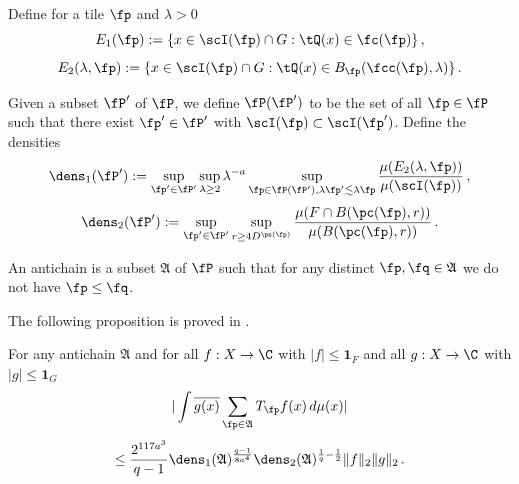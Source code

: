 Define for a tile $\fp$ and $\lambda>0$
\begin{equation}\label{definee1}
    E_1(\fp):=\{x\in \scI(\fp)\cap G: \tQ(x)\in \fc(\fp)\}\, ,
\end{equation}
\begin{equation}\label{definee2}
    E_2(\lambda, \fp):=\{x\in \scI(\fp)\cap G: \tQ(x)\in B_{\fp}(\fcc(\fp), \lambda)\}\, .
\end{equation}



Given a subset $\fP'$ of $\fP$, we define
$\fP(\fP')$ to be the set of
all $\fp \in \fP$ such that there exist $\fp' \in \fP'$ with $\scI(\fp)\subset \scI(\fp')$. Define the densities
\begin{equation}\label{definedens1}
    {\dens}_1(\fP') := \sup_{\fp'\in \fP'}\sup_{\lambda \geq 2} \lambda^{-a} \sup_{\fp \in \fP(\fP'), \lambda \fp' \lesssim \lambda \fp}
    \frac{\mu({E}_2(\lambda, \fp))}{\mu(\scI(\fp))}\, ,
\end{equation}
\begin{equation}\label{definedens2}
    {\dens}_2(\fP') := \sup_{\fp'\in \fP'}
    \sup_{r\ge 4D^{\ps(\fp)}}
    \frac{\mu(F\cap B(\pc(\fp),r))}{\mu(B(\pc(\fp),r))}\, .
\end{equation}





An antichain is a subset $\mathfrak{A}$
of $\fP$ such that for any distinct $\fp,\fq\in \mathfrak{A}$ we do not have $\fp\le \fq$.

The following proposition is proved in .

\begin{proposition}
\label{antichain-operator}
\leanok
{}

For any antichain $\mathfrak{A} $ and for all $f:X\to \C$ with $|f|\le \mathbf{1}_F$ and all $g:X\to\C$ with $|g| \le \mathbf{1}_G$
\begin{equation} \label{eq-antiprop}
    |\int \overline{g(x)} \sum_{\fp \in \mathfrak{A}} T_{\fp} f(x)\, d\mu(x)|
\end{equation}
\begin{equation}
    \le \frac{2^{117a^3}}{q-1} \dens_1(\mathfrak{A})^{\frac {q-1}{8a^4}}\dens_2(\mathfrak{A})^{\frac 1{q}-\frac 12} \|f\|_2 \|g\|_2\, .
\end{equation}
\end{proposition}

